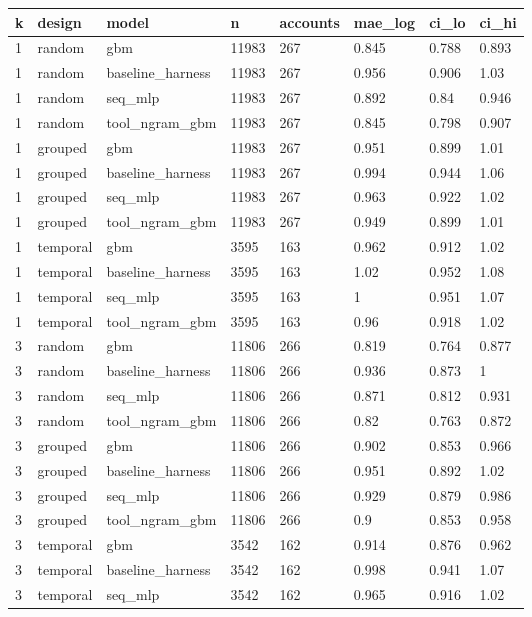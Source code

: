 \begin{tabular}{llllllll}
\toprule
k & design & model & n & accounts & mae\_log & ci\_lo & ci\_hi \\
\midrule
1 & random & gbm & 11983 & 267 & 0.845 & 0.788 & 0.893 \\
1 & random & baseline\_harness & 11983 & 267 & 0.956 & 0.906 & 1.03 \\
1 & random & seq\_mlp & 11983 & 267 & 0.892 & 0.84 & 0.946 \\
1 & random & tool\_ngram\_gbm & 11983 & 267 & 0.845 & 0.798 & 0.907 \\
1 & grouped & gbm & 11983 & 267 & 0.951 & 0.899 & 1.01 \\
1 & grouped & baseline\_harness & 11983 & 267 & 0.994 & 0.944 & 1.06 \\
1 & grouped & seq\_mlp & 11983 & 267 & 0.963 & 0.922 & 1.02 \\
1 & grouped & tool\_ngram\_gbm & 11983 & 267 & 0.949 & 0.899 & 1.01 \\
1 & temporal & gbm & 3595 & 163 & 0.962 & 0.912 & 1.02 \\
1 & temporal & baseline\_harness & 3595 & 163 & 1.02 & 0.952 & 1.08 \\
1 & temporal & seq\_mlp & 3595 & 163 & 1 & 0.951 & 1.07 \\
1 & temporal & tool\_ngram\_gbm & 3595 & 163 & 0.96 & 0.918 & 1.02 \\
3 & random & gbm & 11806 & 266 & 0.819 & 0.764 & 0.877 \\
3 & random & baseline\_harness & 11806 & 266 & 0.936 & 0.873 & 1 \\
3 & random & seq\_mlp & 11806 & 266 & 0.871 & 0.812 & 0.931 \\
3 & random & tool\_ngram\_gbm & 11806 & 266 & 0.82 & 0.763 & 0.872 \\
3 & grouped & gbm & 11806 & 266 & 0.902 & 0.853 & 0.966 \\
3 & grouped & baseline\_harness & 11806 & 266 & 0.951 & 0.892 & 1.02 \\
3 & grouped & seq\_mlp & 11806 & 266 & 0.929 & 0.879 & 0.986 \\
3 & grouped & tool\_ngram\_gbm & 11806 & 266 & 0.9 & 0.853 & 0.958 \\
3 & temporal & gbm & 3542 & 162 & 0.914 & 0.876 & 0.962 \\
3 & temporal & baseline\_harness & 3542 & 162 & 0.998 & 0.941 & 1.07 \\
3 & temporal & seq\_mlp & 3542 & 162 & 0.965 & 0.916 & 1.02 \\

\end{tabular}
